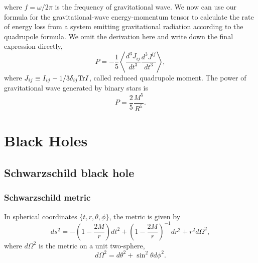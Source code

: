 where $f = \omega / 2\pi$ is the frequency of gravitational wave.
We now can use our formula for the gravitational-wave energy-momentum tensor to calculate the rate of energy loss from a system emitting gravitational radiation
according to the quadrupole formula. We omit the derivation here and write down the final expression directly,
\[P = -\frac{1}{5}\left\langle \frac{d^3 J_{ij}}{dt^3} \frac{d^3 J^{ij}}{dt^3}  \right\rangle,  \]
where $J_{ij} \equiv I_{ij} - 1/3 \delta_{ij} {\rm Tr}I$, called reduced quadrupole moment. The power of gravitational wave generated by binary stars is
\[P = \frac{2}{5} \frac{M^5}{R^5}.\]

\chapter{Black Holes}
\section{Schwarzschild black hole}
\subsection{Schwarzschild metric}
In spherical coordinates $\{t,r,\theta,\phi\}$, the metric is given by
\[ds^2 = -\left(1 - \frac{2M}{r} \right)dt^2 + \left(1 - \frac{2M}{r} \right)^{-1}dr^2 + r^2 d\Omega^2,\]
where $d\Omega^2$ is the metric on a unit two-sphere,
\[d\Omega^2 = d\theta^2 + \sin^2\theta d\phi^2.\]

